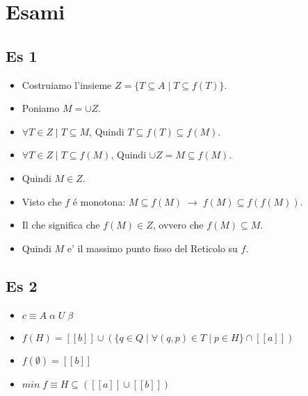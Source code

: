 \chapter{Esami}

\section{Es 1}

\begin{itemize}
    \item Costruiamo l’insieme $Z = \{ T \subseteq A \; | \; T \subseteq f(T) \}$.
    \item Poniamo $M = \cup Z$.
    \item $\forall T \in Z \; | \; T \subseteq M$, Quindi $T \subseteq f(T) \subseteq f(M)$.
    \item $\forall T \in Z \; | \; T \subseteq f(M)$, Quindi $\cup Z = M \subseteq f(M)$.
    \item Quindi $M \in Z$.
    \item Visto che $f$ \'e monotona: $M \subseteq f(M) \; \rightarrow \; f(M) \subseteq f(f(M))$.
    \item Il che significa che $f(M) \in Z$, ovvero che $f(M) \subseteq M$.
    \item Quindi $M$ e' il massimo punto fisso del Reticolo su $f$.
\end{itemize}

\section{Es 2}

\begin{itemize}
    \item $c \equiv A \; \alpha \; U \; \beta$
    \item $f(H) = [[b]] \cup (\{q \in Q \; | \; \forall(q,p) \in T \; | \; p \in H\} \cap [[a]])$
    \item $f(\emptyset) = [[b]]$
    \item $min \; f \equiv H \subseteq ([[a]] \cup [[b]])$
\end{itemize}
